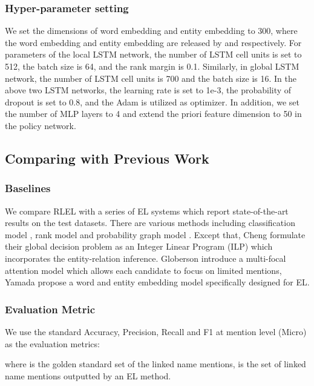 \documentclass[sigconf]{acmart}
\begin{document}
\subsubsection*{Hyper-parameter setting}
We set the dimensions of word embedding and entity embedding to 300, where the word embedding and entity embedding are released by \cite{PenningtonSM14} and \cite{GaneaH17} respectively. For parameters of the local LSTM network, the number of LSTM cell units is set to 512, the batch size is 64, and the rank margin  is 0.1. Similarly, in global LSTM network, the number of LSTM cell units is 700 and the batch size is 16. In the above two LSTM networks, the learning rate is set to 1e-3,  the probability of dropout is set to 0.8, and the Adam is utilized as optimizer. In addition, we set the number of MLP layers to 4 and extend the priori feature dimension to 50 in the policy network.


\subsection{Comparing with Previous Work}
\subsubsection*{Baselines}
We compare RLEL with a series of EL systems which report state-of-the-art results on the test datasets. There are various methods including classification model \cite{MilneW08}, rank model \cite{ChisholmH15, RatinovRDA11} and probability graph model \cite{GuoB18, HoffartYBFPSTTW11, HuangHJ15, GaneaH17, TitovL18a}. Except that, Cheng  \cite{ChengR13} formulate their global decision problem as an Integer Linear Program (ILP) which incorporates the entity-relation inference. Globerson   \cite{GlobersonLCSRP16} introduce a multi-focal attention model which allows each candidate to focus on limited mentions, Yamada  \cite{YamadaS0T16} propose a word and entity embedding model specifically designed for EL. 

\subsubsection*{Evaluation Metric}
We use the standard Accuracy, Precision, Recall and F1 at mention level (Micro) as the evaluation metrics:







where  is the golden standard set of the linked name mentions,  is the set of linked name mentions outputted by an EL method.
\end{document}
